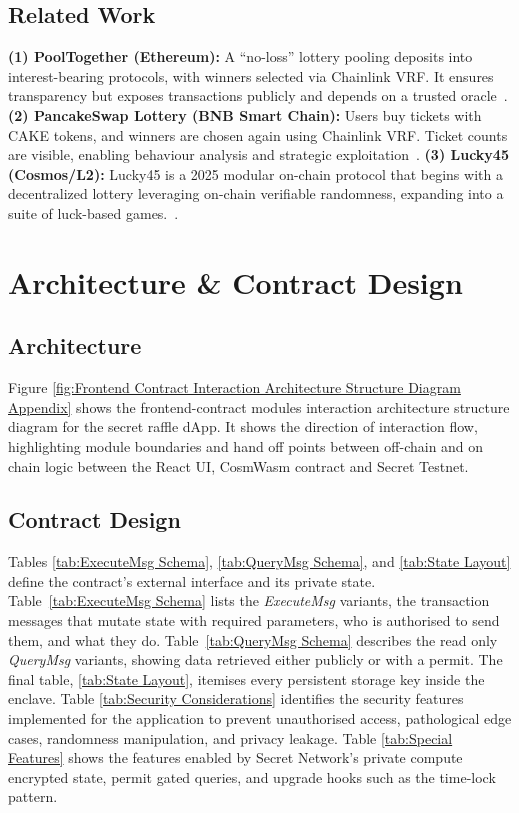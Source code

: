 \documentclass[8pt]{extarticle}
\begin{document}
\subsection{Related Work}
\textbf{(1) PoolTogether (Ethereum):} A ``no-loss'' lottery pooling deposits into interest-bearing protocols, with winners selected via Chainlink VRF. It ensures transparency but exposes transactions publicly and depends on a trusted oracle~\cite{PoolTogether}. \textbf{(2) PancakeSwap Lottery (BNB Smart Chain):} Users buy tickets with CAKE tokens, and winners are chosen again using Chainlink VRF. Ticket counts are visible, enabling behaviour analysis and strategic exploitation~\cite{PancakeSwap}. \textbf{(3) Lucky45 (Cosmos/L2):} Lucky45 is a 2025 modular on-chain protocol that begins with a decentralized lottery leveraging on-chain verifiable randomness, expanding into a suite of luck-based games.~\cite{Lucky45}.

\section{Architecture \& Contract Design}

\subsection{Architecture}
Figure \ref{fig:Frontend Contract Interaction Architecture Structure Diagram Appendix} shows the frontend-contract modules interaction architecture structure diagram for the secret raffle dApp. It shows the direction of interaction flow, highlighting module boundaries and hand off points between off-chain and on chain logic between the React UI, CosmWasm contract and Secret Testnet.

\subsection{Contract Design}

Tables \ref{tab:ExecuteMsg Schema}, \ref{tab:QueryMsg Schema}, and \ref{tab:State Layout} define the contract's external interface and its private state. Table~\ref{tab:ExecuteMsg Schema} lists the \emph{ExecuteMsg} variants, the transaction messages that mutate state with required parameters, who is authorised to send them, and what they do. Table~\ref{tab:QueryMsg Schema} describes the read only \emph{QueryMsg} variants, showing data retrieved either publicly or with a permit. The final table, \ref{tab:State Layout}, itemises every persistent storage key inside the enclave. Table \ref{tab:Security Considerations} identifies the security features implemented for the application to prevent unauthorised access, pathological edge cases, randomness manipulation, and privacy leakage. Table \ref{tab:Special Features} shows the features enabled by Secret Network's private compute encrypted state, permit gated queries, and upgrade hooks such as the time-lock pattern.
\end{document}
